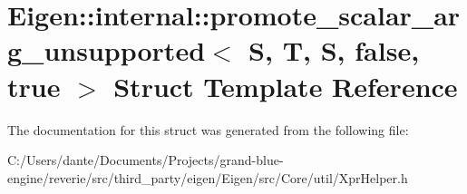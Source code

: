 \hypertarget{struct_eigen_1_1internal_1_1promote__scalar__arg__unsupported_3_01_s_00_01_t_00_01_s_00_01false_00_01true_01_4}{}\section{Eigen\+::internal\+::promote\+\_\+scalar\+\_\+arg\+\_\+unsupported$<$ S, T, S, false, true $>$ Struct Template Reference}
\label{struct_eigen_1_1internal_1_1promote__scalar__arg__unsupported_3_01_s_00_01_t_00_01_s_00_01false_00_01true_01_4}


The documentation for this struct was generated from the following file\+:\begin{DoxyCompactItemize}
\item 
C\+:/\+Users/dante/\+Documents/\+Projects/grand-\/blue-\/engine/reverie/src/third\+\_\+party/eigen/\+Eigen/src/\+Core/util/Xpr\+Helper.\+h\end{DoxyCompactItemize}
